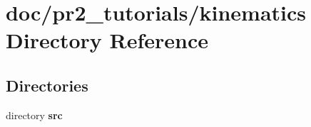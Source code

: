 \section{doc/pr2\-\_\-tutorials/kinematics Directory Reference}
\label{dir_679441e78e14e5b06cb2619cef414b8a}
\subsection*{Directories}
\begin{DoxyCompactItemize}
\item 
directory {\bf src}
\end{DoxyCompactItemize}

